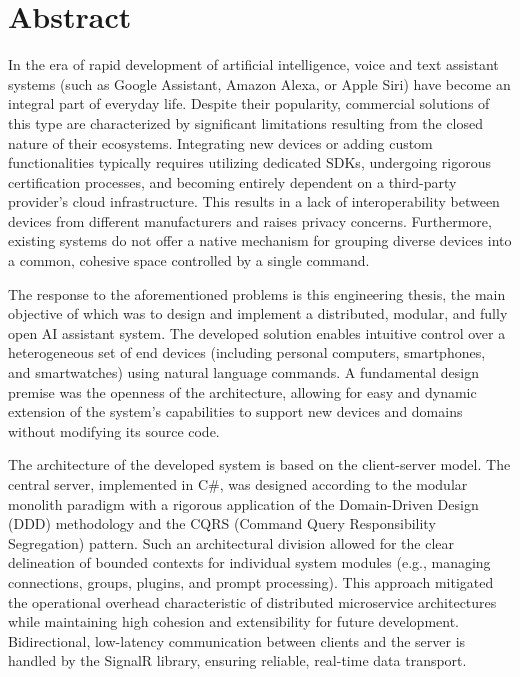 \chapter*{Abstract}
\label{cha:abstract-en}
\makeatletter


\begin{center}
	\noindent \Large \textbf{\@titleEN}
\end{center}

\vspace*{8mm}
In the era of rapid development of artificial intelligence, voice and text assistant systems (such as Google Assistant, Amazon Alexa, or Apple Siri) have become an integral part of everyday life. Despite their popularity, commercial solutions of this type are characterized by significant limitations resulting from the closed nature of their ecosystems. Integrating new devices or adding custom functionalities typically requires utilizing dedicated SDKs, undergoing rigorous certification processes, and becoming entirely dependent on a third-party provider's cloud infrastructure. This results in a lack of interoperability between devices from different manufacturers and raises privacy concerns. Furthermore, existing systems do not offer a native mechanism for grouping diverse devices into a common, cohesive space controlled by a single command.

The response to the aforementioned problems is this engineering thesis, the main objective of which was to design and implement a distributed, modular, and fully open AI assistant system. The developed solution enables intuitive control over a heterogeneous set of end devices (including personal computers, smartphones, and smartwatches) using natural language commands. A fundamental design premise was the openness of the architecture, allowing for easy and dynamic extension of the system's capabilities to support new devices and domains without modifying its source code.

The architecture of the developed system is based on the client-server model. The central server, implemented in C\#, was designed according to the modular monolith paradigm with a rigorous application of the Domain-Driven Design (DDD) methodology and the CQRS (Command Query Responsibility Segregation) pattern. Such an architectural division allowed for the clear delineation of bounded contexts for individual system modules (e.g., managing connections, groups, plugins, and prompt processing). This approach mitigated the operational overhead characteristic of distributed microservice architectures while maintaining high cohesion and extensibility for future development. Bidirectional, low-latency communication between clients and the server is handled by the SignalR library, ensuring reliable, real-time data transport.

